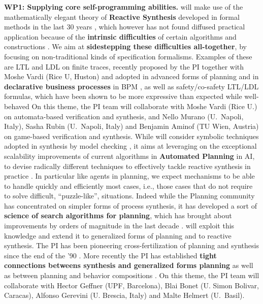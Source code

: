 \textbf{WP1: Supplying core self-programming abilities.}
\project  will make use of the mathematically elegant theory of \textbf{Reactive
  Synthesis} \cite{PnRo89} developed in formal methods in the last 30 years \cite{RecentSynthesis}, which
however has not found diffused practical application because of the
\textbf{intrinsic difficulties} of certain algorithms and constructions \cite{TsaiFVT14,DFogartyKVW13}.
%
We aim at \textbf{sidestepping these difficulties all-together}, by
focusing on non-traditional kinds of specification
formalisms. Examples of these are LTL and
LDL on finite traces, recently proposed by the PI together with Moshe Vardi (Rice U, Huston)
\cite{DeVa13,DeVa15,DeVa16} and adopted in advanced forms of planning  \cite{TorresB15,CamachoTMBM17} and in \textbf{declarative business processes} in BPM \cite{AalstPS09,DeGMGMM14,AAAI17}, as well as safety/co-safety LTL/LDL formulas, which have been shown to be more expressive than expected while well-behaved \cite{}
On this theme, the PI team will collaborate with Moshe Vardi (Rice U.) on automata-based verification and synthesis, and Nello Murano (U.\ Napoli, Italy), Sasha Rubin (U.\ Napoli, Italy) and Benjamin Aminof (TU Wien, Austria) on game-based verification and synthesis.
 While \project will consider symbolic techniques
adopted in synthesis by model checking \cite{BloemJPPS12}, it
aims at leveraging on the exceptional scalability improvements of
current algorithms in \textbf{Automated Planning} in AI, to devise radically
different techniques to effectively tackle reactive synthesis in
practice \cite{GeffnerBo13}.  
In particular like agents in planning, we expect mechanisms to be able
to handle quickly and efficiently most cases, i.e., those cases that
do not require to solve difficult, ``puzzle-like'', situations. Indeed
while the Planning community has concentrated on simpler forms of
process synthesis, it has developed a sort of \textbf{science of
  search algorithms for planning}, which has brought about
improvements by orders of magnitude in the last decade
\cite{PommereningHB17,SteinmetzH17,LipovetzkyG17,DeGMMP17}. \project
will exploit this knowledge and extend it to generalized forms of
planning and to reactive synthesis.
The PI has been pioneering cross-fertilization of planning and
synthesis since the end of the '90
\cite{DeGiacomoV99,CalvaneseGV02,SardinaGLL06,DeGiacomoFPS10,PatriziLGG11,DeGMMP17}. More
recently the PI has established \textbf{tight connections betweens synthesis
and generalized forms planning}
\cite{HuG11,HuG13,DeGiacomoMRS16,BDGR17} as well as between planning
and behavior compositions
\cite{SardinaG08,DePS13,DeGGPSS16,CalvaneseGLV16}.  On this theme, the
PI team will collaborate with Hector Geffner (UPF, Barcelona), Blai
Bonet (U. Simon Bolivar, Caracas), Alfonso Gerevini (U. Brescia,
Italy) and Malte Helmert (U.\ Basil).



